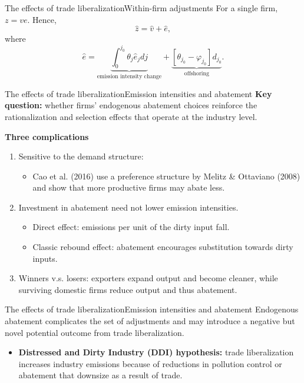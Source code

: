 \documentclass{beamer}
\begin{document}
\begin{frame}[label=wfa]{The effects of trade liberalization}{Within-firm adjustments}
	For a single firm, $z=ve$. Hence,
	\begin{equation}
		\hat{z} = \hat{v} + \hat{e},
	\end{equation}
	where
	\begin{equation}
		\hat{e}=\underbrace{\int_0^{j_0}\theta_j\hat{e}_jdj}_{\text{emission intensity change}} + \underbrace{[\theta_{j_0}-\varphi_{j_0}]d_{j_0}}_{\text{offshoring}}.
	\end{equation}
	\hfill\hyperlink{figure1}{}
\end{frame}
\begin{frame}{The effects of trade liberalization}{Emission intensities and abatement}
	\textbf{Key question:} whether firms' endogenous abatement choices reinforce the rationalization and selection effects that operate at the industry level.

	\medskip
	\textbf{Three complications}
	\begin{enumerate}
		\item Sensitive to the demand structure:
		\begin{itemize}
			\item Cao et al. (2016) use a preference structure by Melitz \& Ottaviano (2008) and show that more productive firms may abate less.
		\end{itemize}
		\item Investment in abatement need not lower emission intensities.
		\begin{itemize}
			\item Direct effect: emissions per unit of the dirty input fall.
			\item Classic rebound effect: abatement encourages substitution towards dirty inputs.
		\end{itemize}
		\item Winners v.s. losers: exporters expand output and become cleaner, while surviving domestic firms reduce output and thus abatement.
	\end{enumerate}
\end{frame}
\begin{frame}{The effects of trade liberalization}{Emission intensities and abatement}
	Endogenous abatement complicates the set of adjustments and may introduce a negative but novel potential outcome from trade liberalization.

	\medskip
	\begin{itemize}
		\item \textbf{Distressed and Dirty Industry (DDI) hypothesis:} trade liberalization increases industry emissions because of reductions in pollution control or abatement that downsize as a result of trade.
	\end{itemize}
\end{frame}
\end{document}
